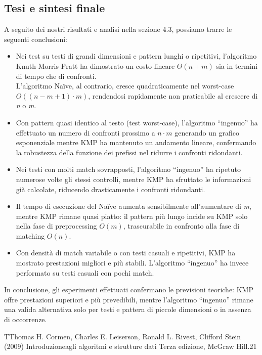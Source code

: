 \documentclass{article}
\begin{document}
\subsection{Tesi e sintesi finale}
A seguito dei nostri risultati e analisi nella sezione 4.3, possiamo trarre le seguenti conclusioni:
\begin{itemize}
    \item Nei test su testi di grandi dimensioni e pattern lunghi o ripetitivi, l'algoritmo Knuth-Morris-Pratt ha dimostrato un costo lineare $\Theta(n + m)$ sia in termini di tempo che di confronti.\\
    L'algoritmo Naïve, al contrario, cresce quadraticamente nel worst-case $O((n - m + 1) \cdot m)$, rendendosi rapidamente non praticabile al crescere di \textit{n} o \textit{m}.
    \item Con pattern quasi identico al testo (test worst-case), l'algoritmo ``ingenuo'' ha effettuato un numero di confronti prossimo a \textit{$n \cdot m$} generando un grafico esponenziale mentre KMP ha mantenuto un andamento lineare, confermando la robustezza della funzione dei prefissi nel ridurre i confronti ridondanti.
    \item Nei testi con molti match sovrapposti, l'algoritmo ``ingenuo'' ha ripetuto numerose volte gli stessi controlli, mentre KMP ha sfruttato le informazioni già calcolate, riducendo drasticamente i confronti ridondanti.
    \item Il tempo di esecuzione del Naïve aumenta sensibilmente all'aumentare di \textit{m}, mentre KMP rimane quasi piatto: il pattern più lungo incide su KMP solo nella fase di preprocessing $O(m)$, trascurabile in confronto alla fase di matching $O(n)$.
    \item Con densità di match variabile o con testi casuali e ripetitivi, KMP ha mostrato prestazioni migliori e più stabili. L'algoritmo ``ingenuo'' ha invece performato su testi casuali con pochi match.
\end{itemize}
In conclusione, gli esperimenti effettuati confermano le previsioni teoriche: KMP offre prestazioni superiori e più prevedibili, mentre l'algoritmo ``ingenuo'' rimane una valida alternativa solo per testi e pattern di piccole dimensioni o in assenza di occorrenze.

\newpage
{}
\begin{thebibliography}{9}
TThomas H. Cormen, Charles E. Leiserson, Ronald L. Rivest, Clifford Stein (2009) Introduzioneagli algoritmi e strutture dati Terza edizione, McGraw Hill.21
\end{thebibliography}
\end{document}
